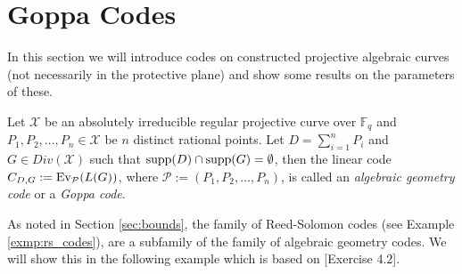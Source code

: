 \section{Goppa Codes}\label{sec:goppa_codes}
In this section we will introduce codes on constructed projective algebraic curves (not necessarily in the protective plane) and show some results on the parameters of these.

\begin{definition}
  Let $\mathcal{X}$ be an absolutely irreducible regular projective curve over $\mathbb{F}_{q}$ and $P_1, P_2, \ldots, P_{n} \in \mathcal{X}$ be $n$ distinct rational points. Let $D = \sum_{i = 1}^{n} P_{i}$ and $G \in Div(\mathcal{X})$ such that $\textnormal{supp}(D) \cap \textnormal{supp}(G) = \emptyset$, then the linear code $C_{D, G} := \textnormal{Ev}_\mathcal{P}(L(G))$, where $\mathcal{P} := (P_1, P_2, \ldots, P_{n})$, is called an \textit{algebraic geometry code} or
  a \textit{Goppa code}.
\end{definition}
As noted in Section \ref{sec:bounds}, the family of Reed-Solomon codes (see Example \ref{exmp:rs_codes}), are a subfamily of the family of algebraic geometry codes. We will show this in the following example which is based on \cite{notes_on_alg_geom_codes}[Exercise 4.2].

